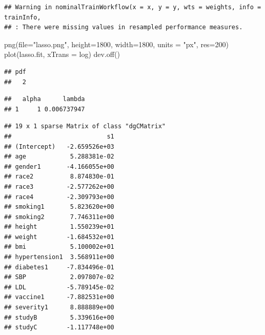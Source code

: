 \documentclass[
]{article}
\newenvironment{Shaded}{\begin{snugshade}}{\end{snugshade}}
\newcommand{\AttributeTok}[1]{\textcolor[rgb]{0.77,0.63,0.00}{#1}}
\newcommand{\DecValTok}[1]{\textcolor[rgb]{0.00,0.00,0.81}{#1}}
\newcommand{\FunctionTok}[1]{\textcolor[rgb]{0.00,0.00,0.00}{#1}}
\newcommand{\NormalTok}[1]{#1}
\newcommand{\SpecialCharTok}[1]{\textcolor[rgb]{0.00,0.00,0.00}{#1}}
\newcommand{\StringTok}[1]{\textcolor[rgb]{0.31,0.60,0.02}{#1}}
\begin{document}
\begin{verbatim}
## Warning in nominalTrainWorkflow(x = x, y = y, wts = weights, info = trainInfo,
## : There were missing values in resampled performance measures.
\end{verbatim}

\begin{Shaded}
\begin{Highlighting}[]
\FunctionTok{png}\NormalTok{(}\AttributeTok{file=}\StringTok{"lasso.png"}\NormalTok{, }\AttributeTok{height=}\DecValTok{1800}\NormalTok{, }\AttributeTok{width=}\DecValTok{1800}\NormalTok{, }\AttributeTok{units =} \StringTok{"px"}\NormalTok{, }\AttributeTok{res=}\DecValTok{200}\NormalTok{)}
\FunctionTok{plot}\NormalTok{(lasso.fit, }\AttributeTok{xTrans =}\NormalTok{ log)}
\FunctionTok{dev.off}\NormalTok{()}
\end{Highlighting}
\end{Shaded}

\begin{verbatim}
## pdf 
##   2
\end{verbatim}

\begin{Shaded}
\end{Shaded}

\begin{verbatim}
##   alpha      lambda
## 1     1 0.006737947
\end{verbatim}

\begin{Shaded}
\end{Shaded}

\begin{verbatim}
## 19 x 1 sparse Matrix of class "dgCMatrix"
##                          s1
## (Intercept)   -2.659526e+03
## age            5.288381e-02
## gender1       -4.166055e+00
## race2          8.874830e-01
## race3         -2.577262e+00
## race4         -2.309793e+00
## smoking1       5.823620e+00
## smoking2       7.746311e+00
## height         1.550239e+01
## weight        -1.684532e+01
## bmi            5.100002e+01
## hypertension1  3.568911e+00
## diabetes1     -7.834496e-01
## SBP            2.097807e-02
## LDL           -5.789145e-02
## vaccine1      -7.882531e+00
## severity1      8.888889e+00
## studyB         5.339616e+00
## studyC        -1.117748e+00
\end{verbatim}
\end{document}
